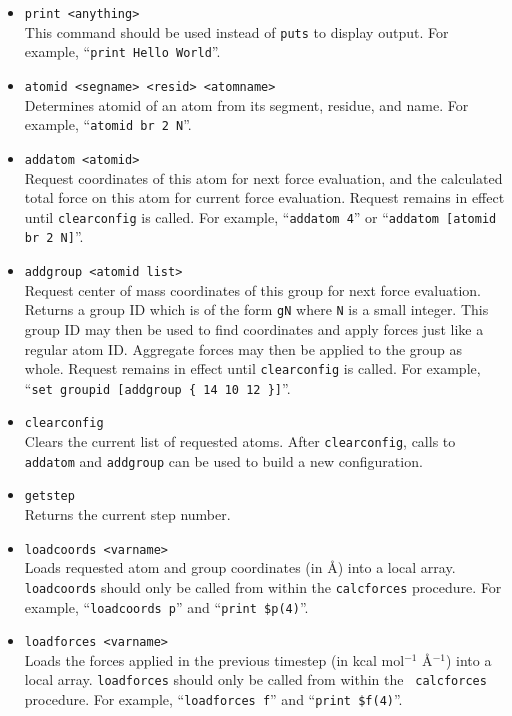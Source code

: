 \begin{itemize}

\item
{\tt print <anything>} \\
This command should be used instead of {\tt puts} to display output.
For example, ``\verb&print Hello World&''.

\item
{\tt atomid <segname> <resid> <atomname>} \\
Determines atomid of an atom from its segment, residue, and name.
For example, ``{\tt atomid br 2 N}''.

\item
{\tt addatom <atomid>} \\
Request coordinates of this atom for next force evaluation, and
the calculated total force on this atom for current force evaluation.
Request remains in effect until {\tt clearconfig} is called.
For example, ``{\tt addatom 4}'' or ``{\tt addatom [atomid br 2 N]}''.

\item
{\tt addgroup <atomid list>} \\
Request center of mass coordinates of this group for next force evaluation.
Returns a group ID which is of the form {\tt gN} where {\tt N} is a small integer.
This group ID may then be used to find coordinates and apply forces just like a regular atom ID.
Aggregate forces may then be applied to the group as whole.
Request remains in effect until {\tt clearconfig} is called.
For example, ``{\tt set groupid [addgroup \{ 14 10 12 \}]}''.

\item
{\tt clearconfig} \\
Clears the current list of requested atoms.  After {\tt clearconfig},
calls to {\tt addatom} and {\tt addgroup} can be used to build a new
configuration.

\item
{\tt getstep} \\
Returns the current step number.

\item
{\tt loadcoords <varname>} \\
Loads requested atom and group coordinates (in \AA) into a local array.
{\tt loadcoords} should only be called from within the {\tt calcforces} procedure.
For example, ``{\tt loadcoords p}'' and ``{\tt print \$p(4)}''.

\item
{\tt loadforces <varname>} \\
Loads the forces applied in the previous timestep (in kcal mol$^{-1}$
\AA$^{-1}$) into a local array.
{\tt loadforces} should only be called from within the {\tt
calcforces} procedure.
For example, ``{\tt loadforces f}'' and ``{\tt print \$f(4)}''.


\end{itemize}
